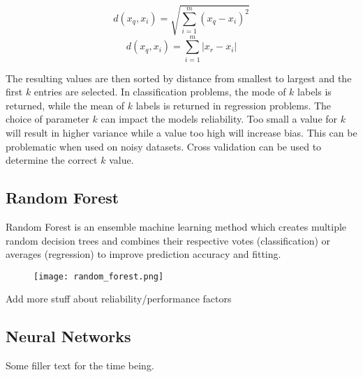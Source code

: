 \begin{equation} \label{Euclidean}
    d(x_q,x_i) = \sqrt{\sum_{i=1}^{m} (x_q - x_i)^2}
\end{equation}
\begin{equation} \label{Manhattan}
    d(x_q,x_i) = \sum_{i=1}^{m} \lvert x_r - x_i \rvert
\end{equation}

The resulting values are then sorted by distance from smallest to largest and the first $k$ entries are selected. 
In classification problems, the mode of $k$ labels is returned, while the mean of $k$ labels is returned in regression problems.
The choice of parameter $k$ can impact the models reliability. Too small a value for $k$ will result in higher variance while a value too high will increase bias. 
This can be problematic when used on noisy datasets. Cross validation can be used to determine the correct $k$ value.


\subsection{Random Forest}
Random Forest is an ensemble machine learning method which creates multiple random decision trees and combines their respective votes (classification) or averages (regression) to improve prediction accuracy and fitting.

\begin{figure}[h]
    \texttt{[image: random\_forest.png]}
    \centering
    \label{fig:RF}
\end{figure}

Add more stuff about reliability/performance factors


\subsection{Neural Networks}
Some filler text for the time being.

